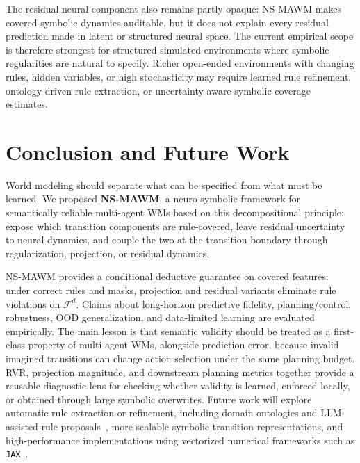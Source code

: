 \documentclass{article}
\theoremstyle{plain}
\theoremstyle{definition}
\theoremstyle{remark}
\begin{document}
The residual neural component also remains partly opaque: NS-MAWM makes covered symbolic dynamics auditable, but it does not explain every residual prediction made in latent or structured neural space. The current empirical scope is therefore strongest for structured simulated environments where symbolic regularities are natural to specify. Richer open-ended environments with changing rules, hidden variables, or high stochasticity may require learned rule refinement, ontology-driven rule extraction, or uncertainty-aware symbolic coverage estimates.

\section{Conclusion and Future Work}
\label{sec:conclusion}

World modeling should separate what can be specified from what must be learned. We proposed \textbf{NS-MAWM}, a neuro-symbolic framework for semantically reliable multi-agent WMs based on this decompositional principle: expose which transition components are rule-covered, leave residual uncertainty to neural dynamics, and couple the two at the transition boundary through regularization, projection, or residual dynamics.

NS-MAWM provides a conditional deductive guarantee on covered features: under correct rules and masks, projection and residual variants eliminate rule violations on $\mathcal{F}^d$. Claims about long-horizon predictive fidelity, planning/control, robustness, OOD generalization, and data-limited learning are evaluated empirically. The main lesson is that semantic validity should be treated as a first-class property of multi-agent WMs, alongside prediction error, because invalid imagined transitions can change action selection under the same planning budget. RVR, projection magnitude, and downstream planning metrics together provide a reusable diagnostic lens for checking whether validity is learned, enforced locally, or obtained through large symbolic overwrites. Future work will explore automatic rule extraction or refinement, including domain ontologies and LLM-assisted rule proposals~\cite{Brown2020gpt3,openai2023gpt4}, more scalable symbolic transition representations, and high-performance implementations using vectorized numerical frameworks such as \texttt{JAX}~\cite{jax2018github}.




\end{document}
